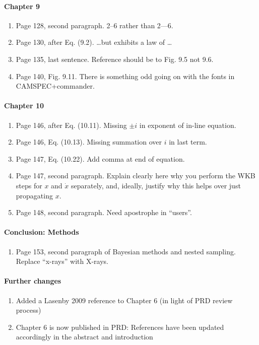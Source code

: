 \documentclass[11pt]{article}
\begin{document}
\paragraph{Chapter 9}
\begin{enumerate}
\item Page 128, second paragraph. 2--6 rather than 2---6.
\item Page 130, after Eq. (9.2). \ldots but exhibits a law of \ldots
\item Page 135, last sentence. Reference should be to Fig. 9.5 not
  9.6.
\item Page 140, Fig. 9.11. There is something odd going on with the
  fonts in CAMSPEC+commander.
\end{enumerate}

\paragraph{Chapter 10}
\begin{enumerate}
\item Page 146, after Eq. (10.11). Missing $\pm i$ in exponent of
  in-line equation.
\item Page 146, Eq. (10.13). Missing summation over $i$ in last term.
\item Page 147, Eq. (10.22). Add comma at end of equation.
\item Page 147, second paragraph. Explain clearly here why you perform
  the WKB steps for $x$ and $\dot{x}$ separately, and, ideally,
  justify why this helps over just propagating $x$.
\item Page 148, second paragraph. Need apostrophe in ``users''.
\end{enumerate}

\paragraph{Conclusion: Methods}
\begin{enumerate}
\item Page 153, second paragraph of Bayesian methods and nested
  sampling. Replace ``x-rays'' with X-rays.
\end{enumerate}



\paragraph{Further changes}
\begin{enumerate}
    \item Added a Lasenby 2009 reference to Chapter 6 (in light of PRD review process)
    \item Chapter 6 is now published in PRD: References have been updated accordingly in the abstract and introduction
\end{enumerate}
\end{document}
